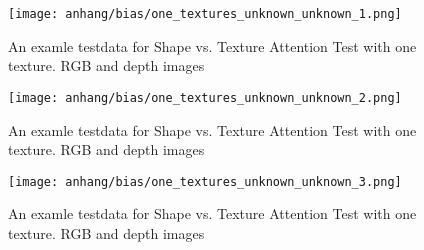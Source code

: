 	\begin{figure}[H]
		\centering
		\texttt{[image: anhang/bias/one\_textures\_unknown\_unknown\_1.png]}
		\caption[An examle testdata for Shape vs. Texture Attention Test with one texture. RGB and depth images]{An examle testdata for Shape vs. Texture Attention Test with one texture. RGB and depth images}
	\end{figure}
	\begin{figure}[H]
		\centering
		\texttt{[image: anhang/bias/one\_textures\_unknown\_unknown\_2.png]}
		\caption[An examle testdata for Shape vs. Texture Attention Test with one texture. RGB and depth images]{An examle testdata for Shape vs. Texture Attention Test with one texture. RGB and depth images}
	\end{figure}
	\begin{figure}[H]
		\centering
		\texttt{[image: anhang/bias/one\_textures\_unknown\_unknown\_3.png]}
		\caption[An examle testdata for Shape vs. Texture Attention Test with one texture. RGB and depth images]{An examle testdata for Shape vs. Texture Attention Test with one texture. RGB and depth images}
	\end{figure}
	\fi
	
	
	
	
	
	
	
	
